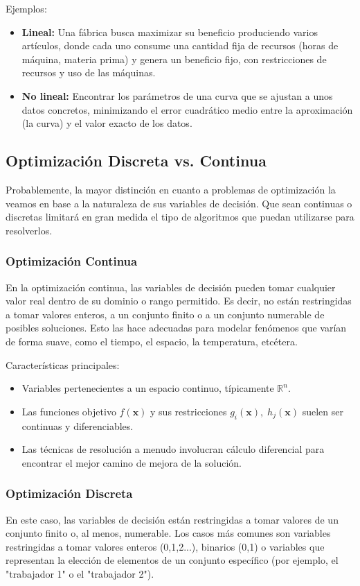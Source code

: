 \documentclass[12pt,a4paper]{book}
\begin{document}
Ejemplos:
\begin{itemize}
    \item \textbf{Lineal:} Una fábrica busca maximizar su beneficio produciendo varios artículos, donde cada uno consume una cantidad fija de recursos (horas de máquina, materia prima) y genera un beneficio fijo, con restricciones de recursos y uso de las máquinas.
    \item \textbf{No lineal:} Encontrar los parámetros de una curva que se ajustan a unos datos concretos, minimizando el error cuadrático medio entre la aproximación (la curva) y el valor exacto de los datos.
\end{itemize}

\hrulefill

\subsection{Optimización Discreta vs. Continua}
Probablemente, la mayor distinción en cuanto a problemas de optimización la veamos en base a la naturaleza de sus variables de decisión. Que sean continuas o discretas
limitará en gran medida el tipo de algoritmos que puedan utilizarse para resolverlos.

\subsubsection{Optimización Continua}
En la optimización continua, las variables de decisión pueden tomar cualquier valor real dentro de su dominio o rango permitido. Es decir, no están restringidas a tomar valores enteros, a un conjunto finito o a un conjunto numerable de posibles soluciones. Esto las hace adecuadas para modelar fenómenos que varían de forma suave, como el tiempo, el espacio, la temperatura, etcétera.

Características principales:
\begin{itemize}
    \item Variables pertenecientes a un espacio continuo, típicamente $\mathbb{R}^n$.
    \item Las funciones objetivo $f(\mathbf{x})$ y sus restricciones $g_i(\mathbf{x}), \;h_j(\mathbf{x})$ suelen ser continuas y diferenciables.
    \item Las técnicas de resolución a menudo involucran cálculo diferencial para encontrar el mejor camino de mejora de la solución.
\end{itemize}

\subsubsection{Optimización Discreta}
En este caso, las variables de decisión están restringidas a tomar valores de un conjunto finito o, al menos, numerable. Los casos más comunes son variables restringidas a tomar valores enteros (0,1,2...), binarios (0,1) o variables que representan la elección de elementos de un conjunto específico (por ejemplo, el "trabajador 1" o el "trabajador 2").
\end{document}
